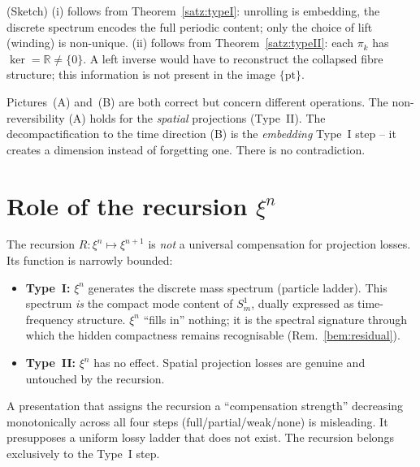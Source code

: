\begin{beweis}
(Sketch) (i) follows from Theorem~\ref{satz:typeI}: unrolling is embedding, the
discrete spectrum encodes the full periodic content; only the choice of lift
(winding) is non-unique. (ii) follows from Theorem~\ref{satz:typeII}: each
$\pi_k$ has $\ker = \mathbb{R}\neq\{0\}$. A left inverse would have to
reconstruct the collapsed fibre structure; this information is not present in
the image $\{\mathrm{pt}\}$.
\end{beweis}

\begin{corollary}
Pictures~(A) and~(B) are both correct but concern different operations. The
non-reversibility (A) holds for the \emph{spatial} projections (Type~II). The
decompactification to the time direction (B) is the \emph{embedding} Type~I
step -- it creates a dimension instead of forgetting one. There is no
contradiction.
\end{corollary}

\section{Role of the recursion $\xi^n$}

The recursion $R:\xi^n \mapsto \xi^{n+1}$ is \emph{not} a universal compensation
for projection losses. Its function is narrowly bounded:
\begin{itemize}
  \item \textbf{Type~I:} $\xi^n$ generates the discrete mass spectrum (particle
  ladder). This spectrum \emph{is} the compact mode content of $S^1_m$, dually
  expressed as time-frequency structure. $\xi^n$ ``fills in'' nothing; it is the
  spectral signature through which the hidden compactness remains recognisable
  (Rem.~\ref{bem:residual}).
  \item \textbf{Type~II:} $\xi^n$ has no effect. Spatial projection losses are
  genuine and untouched by the recursion.
\end{itemize}

\begin{remark}
A presentation that assigns the recursion a ``compensation strength'' decreasing
monotonically across all four steps (full/partial/weak/none) is misleading. It
presupposes a uniform lossy ladder that does not exist. The recursion belongs
exclusively to the Type~I step.
\end{remark}

